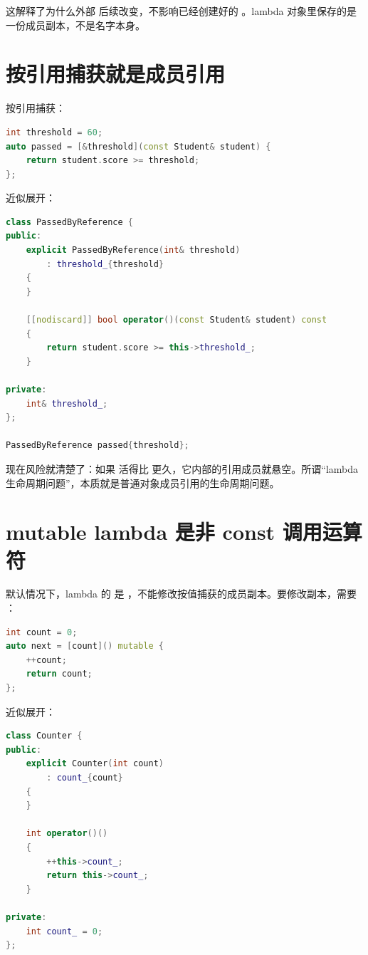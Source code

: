 这解释了为什么外部  后续改变，不影响已经创建好的 。lambda 对象里保存的是一份成员副本，不是名字本身。

\section{按引用捕获就是成员引用}

按引用捕获：

\begin{lstlisting}[language=C++,caption={按引用捕获阈值}]
int threshold = 60;
auto passed = [&threshold](const Student& student) {
    return student.score >= threshold;
};
\end{lstlisting}

近似展开：

\begin{lstlisting}[language=C++,caption={按引用捕获展开为引用成员}]
class PassedByReference {
public:
    explicit PassedByReference(int& threshold)
        : threshold_{threshold}
    {
    }

    [[nodiscard]] bool operator()(const Student& student) const
    {
        return student.score >= this->threshold_;
    }

private:
    int& threshold_;
};

PassedByReference passed{threshold};
\end{lstlisting}

现在风险就清楚了：如果  活得比  更久，它内部的引用成员就悬空。所谓“lambda 生命周期问题”，本质就是普通对象成员引用的生命周期问题。

\section{mutable lambda 是非 const 调用运算符}

默认情况下，lambda 的  是 ，不能修改按值捕获的成员副本。要修改副本，需要 ：

\begin{lstlisting}[language=C++,caption={mutable lambda 修改自己的副本}]
int count = 0;
auto next = [count]() mutable {
    ++count;
    return count;
};
\end{lstlisting}

近似展开：

\begin{lstlisting}[language=C++,caption={mutable 展开成非 const 调用}]
class Counter {
public:
    explicit Counter(int count)
        : count_{count}
    {
    }

    int operator()()
    {
        ++this->count_;
        return this->count_;
    }

private:
    int count_ = 0;
};
\end{lstlisting}

